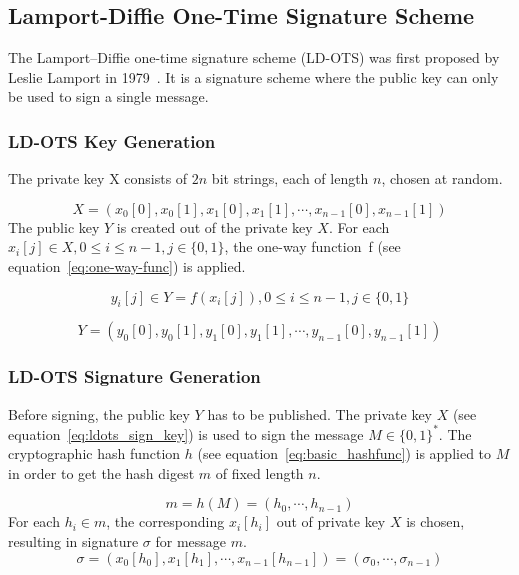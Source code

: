 \subsection{Lamport-Diffie One-Time Signature Scheme}
The Lamport–Diffie one-time signature scheme (LD-OTS) was first proposed by Leslie Lamport in 1979~\cite{lamport_signature_scheme_1979}. 
It is a signature scheme where the public key can only be used to sign a single message.


\subsubsection{LD-OTS Key Generation}
The private key X consists of $2n$ bit strings, each of length $n$, chosen at random. %

\begin{equation}
\label{eq:ldots_sign_key}
X = \left(x_{0}\left[0\right], x_{0}\left[1\right], x_{1}\left[0\right], x_{1}\left[1\right], \cdots, x_{n-1}\left[0\right], x_{n-1}\left[1\right] \right)
\end{equation}
The public key $Y$ is created out of the private key $X$. For each $x_i[j] \in X, 0 \leq i \leq n-1, j \in \lbrace 0,1 \rbrace$, the one-way function~f (see equation~\ref{eq:one-way-func}) is applied.

\begin{equation}
y_i[j] \in Y = f(x_i[j]), 0 \leq i \leq n-1, j \in \lbrace 0,1 \rbrace
\end{equation}

\begin{equation}
Y = \left( 
y_{0}\left[0\right], y_{0}\left[1 \right], y_{1}\left[0\right], y_{1}\left[1\right], \cdots, y_{n-1}\left[0\right], y_{n-1}\left[1\right]
\right)
\end{equation}

\subsubsection{LD-OTS Signature Generation} %
Before signing, the public key $Y$ has to be published.
The private key $X$ (see equation~\ref{eq:ldots_sign_key}) is used to sign the message $M \in \lbrace 0,1 \rbrace^*$. 
The cryptographic hash function $h$ (see equation~\ref{eq:basic_hashfunc}) is applied to $M$ in order to get the hash digest $m$ of fixed length $n$.

\begin{equation}
\label{eq:hash_message}
m = h(M) = (h_{0}, \cdots, h_{n-1})
\end{equation} %
For each $h_i \in m$, the corresponding $x_i[h_i]$ out of private key $X$ is chosen, resulting in signature $\sigma$ for message $m$.
\begin{equation}
\sigma = \left(
x_0 \left[ h_0 \right], x_1\left[ h_1 \right], \cdots, x_{n-1}\left[ h_{n-1}\right]
\right) = (\sigma_0, \cdots, \sigma_{n-1})
\end{equation}

